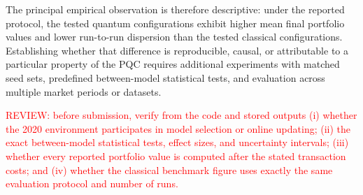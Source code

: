 \documentclass[aps,floatfix,superscriptaddress,twocolumn,tightenlines,amsmath,amssymb,nofootinbib,10pt,longbibliography,prl]{revtex4-2}
\begin{document}
The principal empirical observation is therefore descriptive: under the reported protocol,
the tested quantum configurations exhibit higher mean final portfolio values and lower
run-to-run dispersion than the tested classical configurations. Establishing whether that
difference is reproducible, causal, or attributable to a particular property of the PQC
requires additional experiments with matched seed sets, predefined between-model statistical
tests, and evaluation across multiple market periods or datasets.

\textcolor{red}{REVIEW: before submission, verify from the code and stored
outputs (i) whether the 2020 environment participates in model selection or online updating;
(ii) the exact between-model statistical tests, effect sizes, and uncertainty intervals;
(iii) whether every reported portfolio value is computed after the stated transaction costs;
and (iv) whether the classical benchmark figure uses exactly the same evaluation protocol
and number of runs.}

% 

\end{document}
